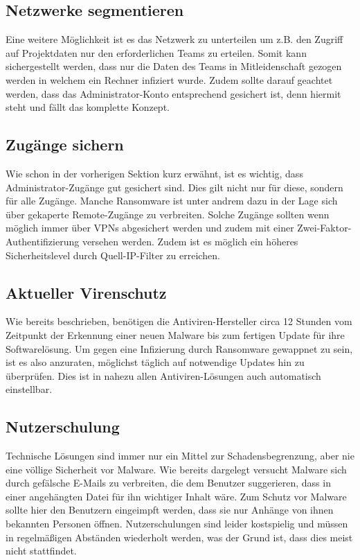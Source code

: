 \subsection{Netzwerke segmentieren}
	Eine weitere Möglichkeit ist es das Netzwerk zu unterteilen um z.B. den Zugriff auf Projektdaten nur den erforderlichen Teams zu erteilen. Somit kann sichergestellt werden, dass nur die Daten des Teams in Mitleidenschaft gezogen werden in welchem ein Rechner infiziert wurde. Zudem sollte darauf geachtet werden, dass das Administrator-Konto entsprechend gesichert ist, denn hiermit steht und fällt das komplette Konzept.\cite{bsi:ransome}
	
\subsection{Zugänge sichern}
	Wie schon in der vorherigen Sektion kurz erwähnt, ist es wichtig, dass Administrator-Zugänge gut gesichert sind. Dies gilt nicht nur für diese, sondern für alle Zugänge. Manche Ransomware ist unter andrem dazu in der Lage sich über gekaperte Remote-Zugänge zu verbreiten. Solche Zugänge sollten wenn möglich immer über VPNs abgesichert werden und zudem mit einer Zwei-Faktor-Authentifizierung versehen werden. Zudem ist es möglich ein höheres Sicherheitslevel durch Quell-IP-Filter zu erreichen.\cite{bsi:ransome}
	
\subsection{Aktueller Virenschutz}

	Wie bereits beschrieben, benötigen die Antiviren-Hersteller circa 12 Stunden vom Zeitpunkt der Erkennung einer neuen Malware bis zum fertigen Update für ihre Softwarelösung. Um gegen eine Infizierung durch Ransomware gewappnet zu sein, ist es also anzuraten, möglichst täglich auf notwendige Updates hin zu überprüfen. Dies ist in nahezu allen Antiviren-Lösungen auch automatisch einstellbar.

\subsection{Nutzerschulung}

	Technische Lösungen sind immer nur ein Mittel zur Schadensbegrenzung, aber nie eine völlige Sicherheit vor Malware. Wie bereits dargelegt versucht Malware sich durch gefälsche E-Mails zu verbreiten, die dem Benutzer suggerieren, dass in einer angehängten Datei für ihn wichtiger Inhalt wäre. Zum Schutz vor Malware sollte hier den Benutzern eingeimpft werden, dass sie nur Anhänge von ihnen bekannten Personen öffnen. Nutzerschulungen sind leider kostspielig und müssen in regelmäßigen Abständen wiederholt werden, was der Grund ist, dass dies meist nicht stattfindet.


